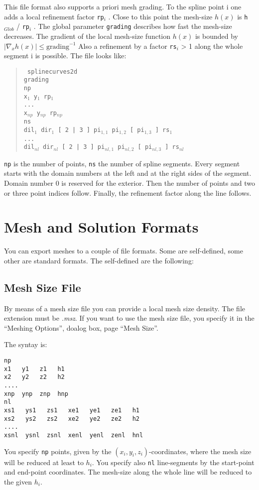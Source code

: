 \documentclass[12pt]{book}
\begin{document}
This file format also supports a priori mesh grading. To the spline 
point i one adds a local refinement factor {\tt rp}$_i$ . Close to 
this point the mesh-size $h(x)$ is {\tt h}$_{Glob}$ / {\tt rp}$_i$ .
The global parameter {\tt grading} describes how fast the mesh-size decreases.
The gradient of the local mesh-size function $h(x)$ is bounded by
$| \nabla_x h(x)| \leq \mbox{grading}^{-1}$ 
Also a refinement by a factor {\tt rs}$_i$ > 1 along the whole 
segment i is possible.
The file looks like:
%
\begin{quote}
\samepage
\tt 
splinecurves2d   \\
grading   \\
np   \\
x$_1$ y$_1$ rp$_1$ \\
...   \\
x$_{np}$ y$_{np}$ rp$_{np}$ \\
ns   \\
dil$_1$ dir$_1$ [ 2 | 3 ] pi$_{1,1}$ pi$_{1,2}$ [ pi$_{1,3}$ ] rs$_1$ \\
... \\
dil$_{nl}$ dir$_{nl}$ [ 2 | 3 ] pi$_{nl,1}$ pi$_{nl,2}$ [ pi$_{nl,3}$ ] rs$_{nl}$ \\
\end{quote}
%
{\tt np} is the number of points, {\tt ns} the number of spline segments.
Every segment starts with the domain numbers at the left and at the
right sides of the segment. Domain number 0 is reserved for the exterior.  
Then the number of points and two or three point indices follow.
Finally, the refinement factor along the line follows.


\chapter{Mesh and Solution Formats}

You can export meshes to a couple of file formats. Some are self-defined,
some other are standard formats. The self-defined are the following:

\section{Mesh Size File}
By means of a mesh size file you can provide a local mesh size density. The file extension must be {\it .msz}. If you want to use the mesh size file, you specify it in the ``Meshing Options'', doalog box, page ``Mesh Size''.

The syntay is:
\begin{verbatim}
np
x1   y1   z1   h1
x2   y2   z2   h2
....
xnp  ynp  znp  hnp
nl
xs1   ys1   zs1   xe1   ye1   ze1   h1
xs2   ys2   zs2   xe2   ye2   ze2   h2
....
xsnl  ysnl  zsnl  xenl  yenl  zenl  hnl
\end{verbatim}
You specify {\tt np} points, given by the $(x_i,y_i,z_i)$-coordinates,
where the mesh size will be reduced at least to $h_i$. You specify
also {\tt nl} line-segments by the start-point and end-point
coordinates. The mesh-size along the whole line will be reduced to the given $h_i$.
\end{document}
